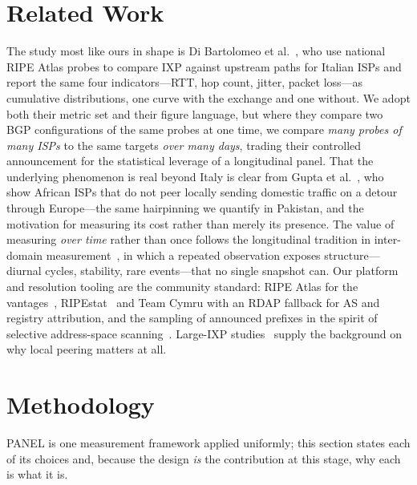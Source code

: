 \documentclass[conference]{IEEEtran}
\begin{document}
\section{Related Work}
The study most like ours in shape is Di Bartolomeo et al.~\cite{dibartolomeo2015}, who use national
RIPE Atlas probes to compare IXP against upstream paths for Italian ISPs and report the same four
indicators---RTT, hop count, jitter, packet loss---as cumulative distributions, one curve with the
exchange and one without. We adopt both their metric set and their figure language, but where they
compare two BGP configurations of the same probes at one time, we compare \emph{many probes of
many ISPs} to the same targets \emph{over many days}, trading their controlled announcement for the
statistical leverage of a longitudinal panel. That the underlying phenomenon is real beyond Italy is
clear from Gupta et al.~\cite{gupta2014}, who show African ISPs that do not peer locally sending
domestic traffic on a detour through Europe---the same hairpinning we quantify in Pakistan, and the
motivation for measuring its cost rather than merely its presence. The value of measuring
\emph{over time} rather than once follows the longitudinal tradition in inter-domain
measurement~\cite{sanchez2014}, in which a repeated observation exposes structure---diurnal cycles,
stability, rare events---that no single snapshot can. Our platform and resolution tooling are the
community standard: RIPE Atlas for the vantages~\cite{ripeatlas}, RIPEstat~\cite{ripestat} and Team
Cymru with an RDAP fallback for AS and registry attribution, and the sampling of announced prefixes
in the spirit of selective address-space scanning~\cite{klick2016}. Large-IXP
studies~\cite{ager2012,chatzis2013} supply the background on why local peering matters at all.

\section{Methodology}
\label{sec:method}
PANEL is one measurement framework applied uniformly; this section states each of its choices and,
because the design \emph{is} the contribution at this stage, why each is what it is.
\end{document}
